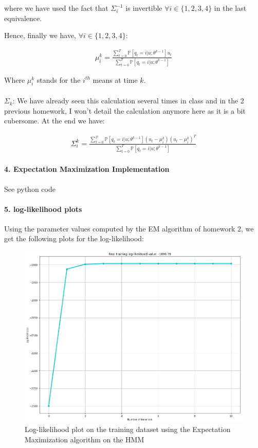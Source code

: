 \documentclass[11pt]{article}
\numberwithin{figure}{section} %
\begin{document}
where we have used the fact that $\Sigma^{-1}_i$ is invertible $\forall i \in \{1,2,3,4\}$ in the last equivalence.

Hence, finally we have, $\forall i \in \{1,2,3,4\}$:
\begin{framed}
\begin{align*}
\mu^k_i = \frac{\sum\limits_{t=0}^T \mathbb{P}[q_t = i | u; \theta^{k-1}] u_t}{\sum\limits_{t=0}^T \mathbb{P}[q_t = i | u; \theta^{k-1}]}
\end{align*}
\end{framed}
Where $\mu^k_i$ stands for the $i^{th}$ means at time $k$. \\
\\

$\Sigma_k$: We have already seen this calculation several times in class and in the 2 previous homework, I won't detail the calculation anymore here as it is a bit cubersome. At the end we have:

\begin{framed}
\begin{align*}
\Sigma^k_i = \frac{\sum\limits_{t=0}^T \mathbb{P}[q_t = i | u; \theta^{k-1}] (u_t - \mu^k_i) (u_t - \mu^k_i)^T}{\sum\limits_{t=0}^T \mathbb{P}[q_t = i | u; \theta^{k-1}]}
\end{align*}
\end{framed}

\paragraph{4. Expectation Maximization Implementation} See python code

\paragraph{5. log-likelihood plots}
Using the parameter values computed by the EM algorithm of homework 2, we get the following plots for the log-likelihood:

\begin{figure}[H]
\centering
\includegraphics[width=0.75\linewidth]{images/q6_train}
\caption{Log-likelihood plot on the training dataset using the Expectation Maximization algorithm on the HMM}
\label{fig:log_train}
\end{figure}
\end{document}
